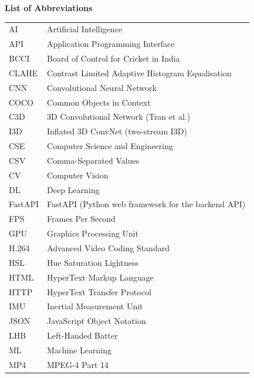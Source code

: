 \vspace*{0.15cm}
\begin{center}
    \Large\bfseries List of Abbreviations
\end{center}
\vspace{0.35\baselineskip}

\begin{justify}
\setlength{\tabcolsep}{5pt}
\renewcommand{\arraystretch}{1.12}
\small
\noindent
\begin{tabularx}{\textwidth}{@{}>{\raggedright\arraybackslash}p{}@{\hspace{0.6em}}>{\raggedright\arraybackslash}X@{}}
 AI & Artificial Intelligence \\
 API & Application Programming Interface \\
 BCCI & Board of Control for Cricket in India \\
 CLAHE & Contrast Limited Adaptive Histogram Equalisation \\
 CNN & Convolutional Neural Network \\
 COCO & Common Objects in Context \\
 C3D & 3D Convolutional Network (Tran et al.) \\
 I3D & Inflated 3D ConvNet (two-stream I3D) \\
 CSE & Computer Science and Engineering \\
 CSV & Comma-Separated Values \\
 CV & Computer Vision \\
 DL & Deep Learning \\
 FastAPI & FastAPI (Python web framework for the backend API) \\
 FPS & Frames Per Second \\
 GPU & Graphics Processing Unit \\
 H.264 & Advanced Video Coding Standard \\
 HSL & Hue Saturation Lightness \\
 HTML & HyperText Markup Language \\
 HTTP & HyperText Transfer Protocol \\
 IMU & Inertial Measurement Unit \\
 JSON & JavaScript Object Notation \\
 LHB & Left-Handed Batter \\
 ML & Machine Learning \\
 MP4 & MPEG-4 Part 14 \\

\end{tabularx}
\end{justify}
